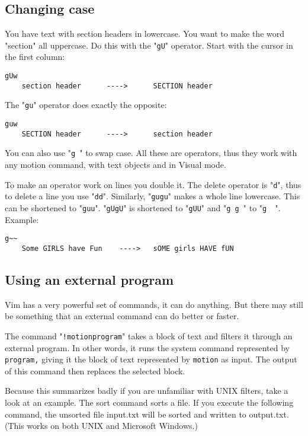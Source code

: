 {\subsection{Changing case}
You have text with section headers in lowercase.
You want to make the word "section" all uppercase.
Do this with the "\texttt{gU}" operator.
Start with the cursor in the first column:

\begin{Verbatim}[samepage=true]
                         gUw
    section header      ---->      SECTION header
\end{Verbatim}

The "\texttt{gu}" operator does exactly the opposite:

\begin{Verbatim}[samepage=true]
                         guw
    SECTION header      ---->      section header
\end{Verbatim}

You can also use "\texttt{g~}" to swap case.
All these are operators, thus they work with any motion command, with text objects and in Visual mode.

To make an operator work on lines you double it.
The delete operator is "\texttt{d}", thus to delete a line you use "\texttt{dd}".
Similarly, "\texttt{gugu}" makes a whole line lowercase.
This can be shortened to "\texttt{guu}".
"\texttt{gUgU}" is shortened to "\texttt{gUU}" and "\texttt{g~g~}" to "\texttt{g~~}".
Example:

\begin{Verbatim}[samepage=true]
                            g~~ 
    Some GIRLS have Fun    ---->   sOME girls HAVE fUN 
\end{Verbatim}
\subsection{Using an external program}
Vim has a very powerful set of commands, it can do anything.
But there may still be something that an external command can do better or faster.

The command "\texttt{!{motion}{program}}" takes a block of text and filters it through an external program.
In other words, it runs the system command represented by \texttt{{program},} giving it the block of text represented by \texttt{{motion}} as input.
The output of this command then replaces the selected block.

Because this summarizes badly if you are unfamiliar with UNIX filters, take a look at an example.
The sort command sorts a file.
If you execute the following command, the unsorted file input.txt will be sorted and written to output.txt.
(This works on both UNIX and Microsoft Windows.)

}

